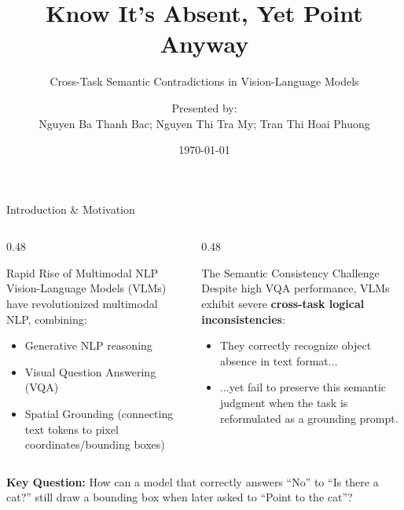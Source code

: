 \documentclass[aspectratio=169]{beamer}
\title[VLM Cross-Task Contradictions]{Know It's Absent, Yet Point Anyway}
\subtitle{Cross-Task Semantic Contradictions in Vision-Language Models}
\author[Bac, My, Phuong]{Presented by:\\Nguyen Ba Thanh Bac; Nguyen Thi Tra My; Tran Thi Hoai Phuong}
\institute{COMP5040 - Natural Language Processing}
\date{\today}
\begin{document}
\begin{frame}[plain]
    \titlepage
\end{frame}

\begin{frame}{Introduction \& Motivation}
    \begin{columns}[T]
        \begin{column}{0.48\textwidth}
            \begin{block}{Rapid Rise of Multimodal NLP}
                Vision-Language Models (VLMs) have revolutionized multimodal NLP, combining:
                \begin{itemize}
                    \item Generative NLP reasoning
                    \item Visual Question Answering (VQA)
                    \item Spatial Grounding (connecting text tokens to pixel coordinates/bounding boxes)
                \end{itemize}
            \end{block}
        \end{column}
        
        \begin{column}{0.48\textwidth}
            \begin{alertblock}{The Semantic Consistency Challenge}
                Despite high VQA performance, VLMs exhibit severe \textbf{cross-task logical inconsistencies}:
                \begin{itemize}
                    \item They correctly recognize object absence in text format...
                    \item ...yet fail to preserve this semantic judgment when the task is reformulated as a grounding prompt.
                \end{itemize}
            \end{alertblock}
        \end{column}
    \end{columns}
    
    \vspace{0.2cm}
    \centering
    \textcolor{secondary}{\textbf{Key Question:}} How can a model that correctly answers ``No'' to ``Is there a cat?'' still draw a bounding box when later asked to ``Point to the cat''?
\end{frame}
\end{document}
